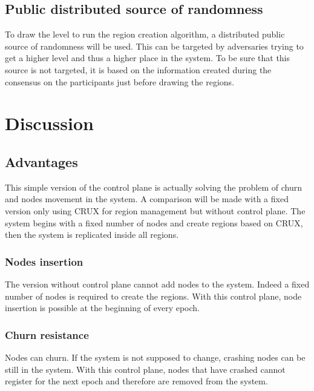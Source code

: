 \documentclass[a4paper,11pt,oneside]{report}
\begin{document}
\subsection{Public distributed source of randomness}
To draw the level to run the region creation algorithm, a distributed public
source of randomness will be used. This can be targeted by adversaries trying to
get a higher level and thus a higher place in the system. To be sure that this
source is not targeted, it is  based on the information created during the
consensus on the participants just before drawing the regions. 

\section{Discussion}
\subsection{Advantages}
This simple version of the control plane is actually solving the problem of
churn and nodes movement in the system. A comparison will be made with a fixed
version only using CRUX for region management but without control plane. The
system begins with a fixed number of nodes and create regions based on CRUX,
then the system is replicated inside all regions. 

\subsubsection{Nodes insertion}
The version without control plane cannot add nodes to the system. Indeed a
fixed number of nodes is required to create the regions. With this control
plane, node insertion is possible at the beginning of every epoch.


\subsubsection{Churn resistance}
Nodes can churn. If the system is not supposed to change, crashing nodes can be
still in the system. With this control plane, nodes that have crashed cannot
register for the next epoch and therefore are removed from the system. 
\end{document}
